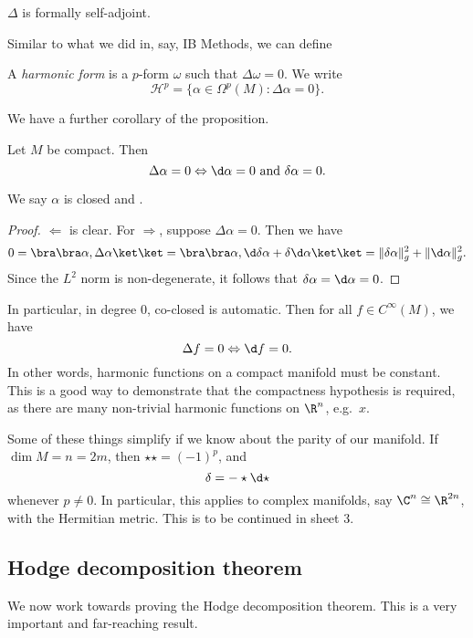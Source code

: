 \documentclass[a4paper]{article}
\begin{document}
\begin{cor}
  $\Delta$ is formally self-adjoint.
\end{cor}

Similar to what we did in, say, IB Methods, we can define
\begin{defi}
  A \emph{harmonic form} is a $p$-form $\omega$ such that $\Delta \omega = 0$. We write
  \[
    \mathcal{H}^p = \{\alpha \in \Omega^p(M): \Delta \alpha = 0\}.
  \]
\end{defi}

We have a further corollary of the proposition.
\begin{cor}
  Let $M$ be compact. Then
  \[
    \Delta \alpha = 0 \Leftrightarrow \d \alpha = 0\text{ and }\delta \alpha = 0.
  \]
\end{cor}
We say $\alpha$ is closed and .

\begin{proof}
  $\Leftarrow$ is clear. For $\Rightarrow$, suppose $\Delta \alpha = 0$. Then we have
  \[
    0 = \bra\bra \alpha, \Delta \alpha\ket\ket = \bra\bra\alpha, \d \delta \alpha + \delta \d \alpha\ket\ket = \|\delta \alpha\|_g^2 + \|\d \alpha\|_g^2.
  \]
  Since the $L^2$ norm is non-degenerate, it follows that $\delta \alpha = \d \alpha = 0$.
\end{proof}

In particular, in degree $0$, co-closed is automatic. Then for all $f \in C^\infty(M)$, we have
\[
  \Delta f = 0 \Leftrightarrow \d f = 0.
\]
In other words, harmonic functions on a compact manifold must be constant. This is a good way to demonstrate that the compactness hypothesis is required, as there are many non-trivial harmonic functions on $\R^n$, e.g.\ $x$.

Some of these things simplify if we know about the parity of our manifold. If $\dim M = n = 2m$, then $\star\star = (-1)^p$, and
\[
  \delta = - \star \d \star
\]
whenever $p \not= 0$. In particular, this applies to complex manifolds, say $\C^n \cong \R^{2n}$, with the Hermitian metric. This is to be continued in sheet 3.

\subsection{Hodge decomposition theorem}
We now work towards proving the Hodge decomposition theorem. This is a very important and far-reaching result.
\end{document}
